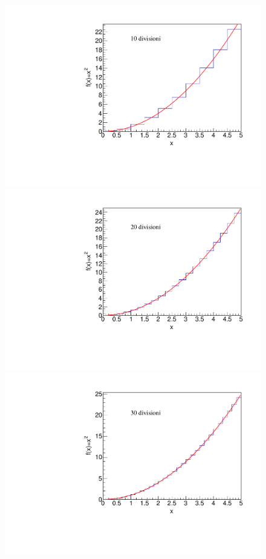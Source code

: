 \documentclass[11pt,fleqn]{book} %
\begin{document}
\begin{figure}[h]
\centering
\includegraphics[scale=0.3]{./Pictures/intpar10.pdf}
\includegraphics[scale=0.3]{./Pictures/intpar20.pdf}\\
\includegraphics[scale=0.3]{./Pictures/intpar30.pdf}

\end{figure}
\end{document}
